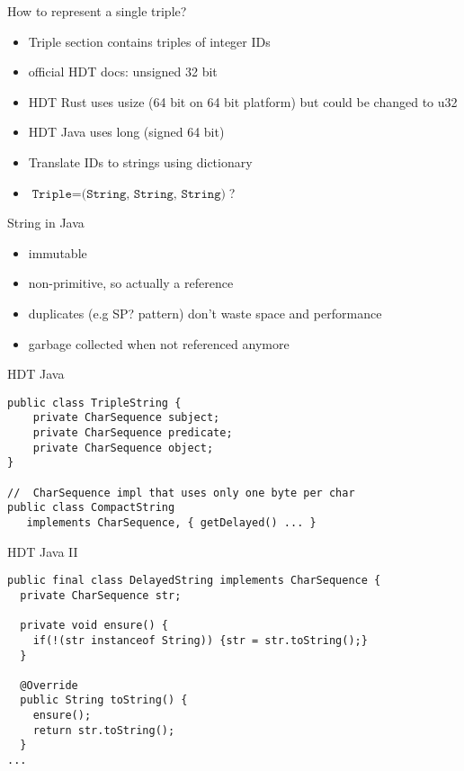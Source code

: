 \documentclass[14pt,aspectratio=169]{beamer}
\newcommand\pro{\item[$+$]}
\begin{document}
\begin{frame}{How to represent a single triple?}
\centering
{}\\
\begin{itemize}
\item Triple section contains triples of integer IDs
\item official HDT docs: unsigned 32 bit
\item HDT Rust uses usize (64 bit on 64 bit platform) but could be changed to u32
\item HDT Java uses long (signed 64 bit)
\item Translate IDs to strings using dictionary
\item $\texttt{Triple} = \texttt{(String, String, String)}$?
\end{itemize}
\end{frame}

\begin{frame}{String in Java}
\begin{itemize}
\pro immutable
\pro non-primitive, so actually a reference
\pro duplicates (e.g SP? pattern) don't waste space and performance
\pro garbage collected when not referenced anymore
\end{itemize}
\end{frame}

\begin{frame}[fragile]{HDT Java}
\small
\begin{verbatim}
public class TripleString {
    private CharSequence subject;
    private CharSequence predicate;
    private CharSequence object;
}

//  CharSequence impl that uses only one byte per char
public class CompactString
   implements CharSequence, { getDelayed() ... }
\end{verbatim}
\end{frame}

\begin{frame}[fragile]{HDT Java II}
\small
\begin{verbatim}
public final class DelayedString implements CharSequence {
  private CharSequence str;

  private void ensure() {
    if(!(str instanceof String)) {str = str.toString();}
  }

  @Override
  public String toString() {
    ensure();
    return str.toString();
  }
...
\end{verbatim}
\end{frame}
\end{document}
